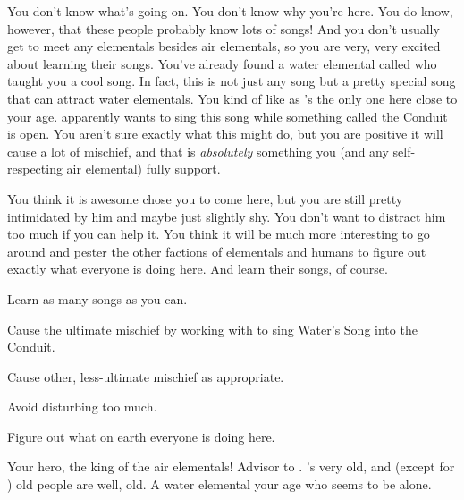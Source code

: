 \documentclass[char]{elementals}
\begin{document}
You don't know what's going on. You don't know why you're here. You do know, however, that these people probably know lots of songs! And you don't usually get to meet any elementals besides air elementals, so you are very, very excited about learning their songs. You've already found a water elemental called \cMiniWater{\intro} who taught you a cool song. In fact, this is not just any song but a pretty special song that can attract water elementals. You kind of like \cMiniWater{} as \cMiniWater{\they}'s the only one here close to your age. \cMiniWater{\They} apparently wants to sing this song while something called the Conduit is open. You aren't sure exactly what this might do, but you are positive it will cause a lot of mischief, and that is \emph{absolutely} something you (and any self-respecting air elemental) fully support.

You think it is awesome \cKing{} chose you to come here, but you are still pretty intimidated by him and maybe just slightly shy. You don't want to distract him too much if you can help it. You think it will be much more interesting to go around and pester the other factions of elementals and humans to figure out exactly what everyone is doing here. And learn their songs, of course.

\begin{itemz}[Goals]
	\item  Learn as many songs as you can.
	\item  Cause the ultimate mischief by working with \cMiniWater{} to sing Water's Song into the Conduit.
	\item  Cause other, less-ultimate mischief as appropriate.
	\item  Avoid disturbing \cKing{} too much.
	\item  Figure out what on earth everyone is doing here.
\end{itemz}

\begin{contacts}
	\contact{\cKing{\intro}} Your hero, the king of the air elementals!
	\contact{\cNaturalist{\intro}} Advisor to \cKing{}. \cNaturalist{\They}'s very old, and (except for \cKing{}) old people are well, old.
	\contact{\cMiniWater{\intro}} A water elemental your age who seems to be alone.
\end{contacts} 
\end{document}
